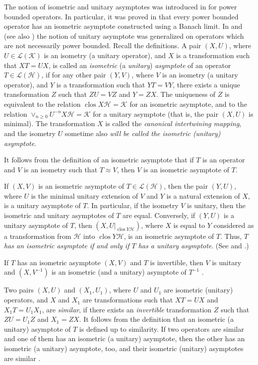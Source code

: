 \documentclass[a4paper,oneside,11pt]{amsart}
\numberwithin{equation}{section}
\theoremstyle{plain}
\theoremstyle{definition}
\begin{document}
The notion of isometric and unitary asymptotes was introduced in \cite{ker89} for power bounded operators. In particular, it was proved 
in \cite{ker89} that every power bounded operator has an isometric asymptote constructed using a Banach limit.
 In \cite{ker16} and  \cite{kerntuple} (see also {\cite[Sec. IX.1]{nfbk}}) the notion of unitary asymptote was  generalized  on operators which are not necessarily power bounded. 
Recall the definitions.  
A pair $(X,U)$, where $U\in\mathcal L(\mathcal K)$ is an isometry (a unitary operator), and $X$ is a 
 transformation such that $XT=UX$, 
 is called an \emph{isometric} (a \emph{unitary}) \emph{asymptote} of an operator $T\in\mathcal L(\mathcal H)$, if for any other pair $(Y,V)$, 
where $V$ is an isometry (a unitary operator), and $Y$ is a  transformation such that $YT=VY$, there exists 
a unique transformation $Z$ such that $ZU=VZ$ and $Y=ZX$. The uniqueness of $Z$ is equivalent to the relation 
$\operatorname{clos}X\mathcal H=\mathcal K$ for an isometric asymptote, and to the relation  
$\vee_{n\geq 0}U^{-n}X\mathcal H = \mathcal K$ for a unitary asymptote (that is, the pair $(X,U)$ is minimal). 
The transformation $X$ is called the \emph{canonical intertwining mapping}, and the isometry $U$ sometime also 
\emph{will be called the isometric (unitary) asymptote}. 

It follows from the definition of an isometric asymptote that if $T$ is an operator and $V$ is an isometry such that 
  $T\approx V$, then $V$ is an isometric asymptote of $T$. 

If $(X,V)$ is an isometric asymptote of $T\in\mathcal L(\mathcal H)$, then the pair $(Y,U)$, where $U$ is the minimal unitary extension of $V$ 
and $Y$ is a natural extension of $X$, is a unitary asymptote of $T$. In particular, if the isometry $V$ is unitary, then the 
isometric and unitary asymptotes of $T$ are equal.  Conversely, if  $(Y,U)$ is a unitary asymptote of $T$, then 
$(X,U|_{\operatorname{clos}Y\mathcal H})$, where $X$ is equal to $Y$ considered as a transformation from $\mathcal H$ 
into $\operatorname{clos}Y\mathcal H$, is an isometric asymptote of $T$. Thus, \emph{$T$ has an isometric asymptote 
 if and only if $T$ has a unitary asymptote}. (See \cite{ker89} and  {\cite[Sec. IX.1]{nfbk}}.)

If $T$ has an isometric asymptote $(X,V)$ and $T$ is invertible, then $V$ is unitary and $(X,V^{-1})$ 
is an isometric (and a unitary) asymptote of $T^{-1}$ {\cite[Proposition 22(a)]{kerntuple}}. 

Two pairs $(X,U)$ and $(X_1,U_1)$,
 where $U$ and $U_1$ are isometric (unitary) operators, and $X$ and $X_1$ are  transformations such that $XT=UX$ and $X_1T=U_1X_1$, 
are  \emph{similar}, if there exists an \emph{invertible} transformation $Z$
such that $ZU=U_1Z$ and $X_1=ZX$. It follows from the definition  that 
 an isometric (a unitary) asymptote of $T$ is defined up to similarity. 
If two operators are similar and one of them has an isometric (a unitary) asymptote, then the other has an isometric (a unitary) 
 asymptote, too, 
and their isometric (unitary) asymptotes are similar \cite{ker89}. 
\end{document}
